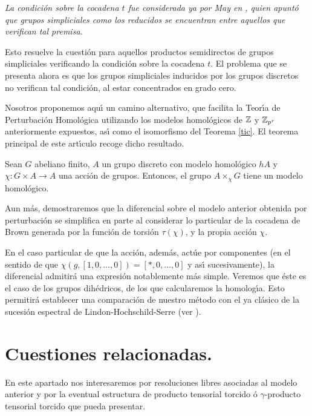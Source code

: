 \begin{rmk} {\em La condici\'{o}n sobre la cocadena $t$ fue
considerada ya por May en \cite{May67}, quien apunt\'{o} que grupos
simpliciales como los reducidos se encuentran entre aquellos que
verifican tal premisa.}
\end{rmk}

Esto resuelve la cuesti\'{o}n para aquellos productos semidirectos
de grupos simpliciales verificando la condici\'{o}n sobre la
cocadena $t$. El problema que se presenta ahora es que los
grupos simpliciales inducidos por los grupos discretos no
verifican tal condici\'{o}n, al estar concentrados en grado cero.

Nosotros proponemos aqu\'{\i} un camino alternativo, que facilita la
Teor\'{\i}a de Perturbaci\'{o}n Homol\'{o}gica utilizando los modelos
homol\'{o}gicos de ${\Bbb Z}$ y ${\Bbb Z} _{p^r}$ anteriormente expuestos, as\'{\i} como
el isomorfismo del Teorema \ref{tic}. El teorema principal de este
art\'{\i}culo recoge dicho resultado.

\begin{thr} \label{mhps} Sean $G$ abeliano finito, $A$ un grupo discreto con
modelo homol\'{o}gico $hA$ y $\chi :G \times A \rightarrow A$ una acci\'{o}n
de grupos. Entonces, el grupo $A \times _\chi G$ tiene un modelo
homol\'{o}gico.
\end{thr}

Aun m\'{a}s, demostraremos que la diferencial sobre el modelo anterior obtenida
por perturbaci\'{o}n se
simplifica en parte al considerar lo particular de la cocadena de
Brown generada por la funci\'{o}n de torsi\'{o}n $\tau (\chi)$,
y la propia acci\'{o}n $\chi$.

En el caso particular de que la acci\'{o}n, adem\'{a}s, act\'{u}e por
componentes (en el sentido de que $\chi (g,[1,0, \ldots , 0])=[*,0, \ldots ,0]$
y as\'{\i} sucesivamente), la diferencial admitir\'{a} una expresi\'{o}n
notablemente m\'{a}s simple. Veremos que \'{e}ste es el caso de los
grupos dih\'{e}dricos, de los que calcularemos la homolog\'{\i}a.
Esto permitir\'{a} establecer una comparaci\'{o}n de nuestro m\'{e}todo
con el ya cl\'{a}sico de la sucesi\'{o}n espectral de Lindon-Hochschild-Serre (ver
\cite{Wei}).

\section{Cuestiones relacionadas.}

En este apartado nos interesaremos por resoluciones libres
asociadas al modelo anterior y por la eventual estructura de
producto tensorial torcido \'{o} $\gamma$-producto tensorial torcido
que pueda presentar.

